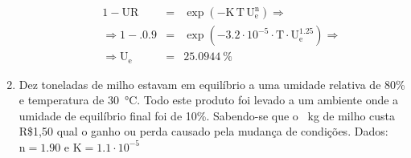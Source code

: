 \documentclass[a4paper, 12pt]{article}
\newcommand{\ur}{\text{UR}}
\newcommand{\kk}{\text{K}}
\newcommand{\tpt}{\text{T}}
\newcommand{\ue}{\text{U}_{\text{e}}}
\begin{document}
\begin{enumerate}
\begin{enumerate}
\begin{minipage}{.75\linewidth}
				\begin{eqnarray}
					1-\ur&=&\exp(-\kk\,\tpt\,\ue^{\text{n}})\Rightarrow\\
					\Rightarrow 1-.0.9&=&\exp(-3.2\cdot 10^{-5}\cdot\tpt \cdot\ue^{1.25})\Rightarrow\\
					\Rightarrow\ue&=&\SI{25.0944}{\percent}				
				\end{eqnarray}
			\end{minipage}
		\end{enumerate}
	
		\item Dez toneladas de milho estavam em equilíbrio a uma umidade relativa de 80\% e temperatura de \SI{30}{\celsius}. Todo este produto foi levado a um ambiente onde a umidade de equilíbrio final foi de 10\%. Sabendo-se que o \SI{}{\kilogram} de milho custa R\$1,50 qual o ganho ou perda causado pela mudança de condições. Dados: $\text{n}=1.90$ e $\kk=1.1\cdot10^{-5}$
	\end{enumerate}
\end{document}
